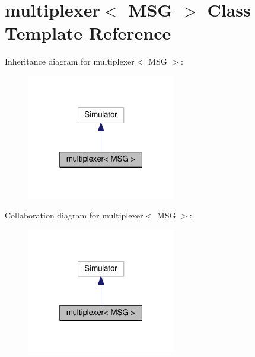 \hypertarget{classmultiplexer}{}\section{multiplexer$<$ M\+SG $>$ Class Template Reference}
\label{classmultiplexer}


Inheritance diagram for multiplexer$<$ M\+SG $>$\+:\nopagebreak
\begin{figure}[H]
\begin{center}
\leavevmode
\includegraphics[width=184pt]{classmultiplexer__inherit__graph}
\end{center}
\end{figure}


Collaboration diagram for multiplexer$<$ M\+SG $>$\+:\nopagebreak
\begin{figure}[H]
\begin{center}
\leavevmode
\includegraphics[width=184pt]{classmultiplexer__coll__graph}
\end{center}
\end{figure}
